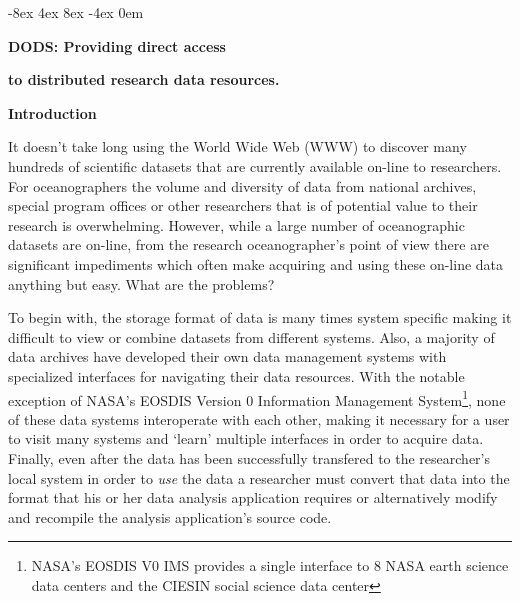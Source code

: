 
%
%



\topmargin -8ex
\footskip 4ex
\headheight 8ex
\footheight -4ex
\textwidth 6.25in
\textheight 8.25in
\oddsidemargin 0em
\def \dods{Distributed Oceanographic Data System }
\def \dodsns{Distributed Oceanographic Data System}
\def \1em{\hskip 1em}
\def \2em{\hskip 2em}
\def \3em{\hskip 3em}
\def \4em{\hskip 4em}
\def \dap{data access protocol }
\def \dapns{data access protocol}



\Large
\centerline {\bf DODS: Providing direct access }
\centerline {\bf to distributed research data resources.}
\normalsize

\large
\bigskip
\noindent
{\bf Introduction}
\medskip
\normalsize 

It doesn't take long using the World Wide Web (WWW) to discover many hundreds
of scientific datasets that are currently available on-line to researchers.
For oceanographers the volume and diversity of data from national archives,
special program offices or other researchers that is of potential value to
their research is overwhelming.  However, while a large number of oceanographic
datasets are on-line, from the research oceanographer's point of view there
are significant impediments which often make acquiring and using these
on-line data anything but easy.  What are the problems?

To begin with, the storage format of data is many times system specific
making it difficult to view or combine datasets from different systems.
Also, a majority of data archives have developed their own data management
systems with specialized interfaces for navigating their data resources.
With the notable exception of NASA's EOSDIS Version 0 Information Management
System\footnote{NASA's EOSDIS V0 IMS provides a single interface to 8 NASA
  earth science data centers and the CIESIN social science data center}, none
of these data systems interoperate with each other, making it necessary for a
user to visit many systems and `learn' multiple interfaces in order to
acquire data.  Finally, even after the data has been successfully transfered
to the researcher's local system in order to {\em use} the data a researcher
must convert that data into the format that his or her data analysis
application requires or alternatively modify and recompile the analysis
application's source code.

